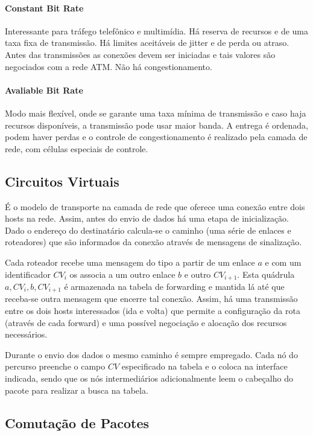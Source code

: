\paragraph{Constant Bit Rate} Interessante para tráfego telefônico e multimídia. Há reserva de recursos e de uma taxa fixa de transmissão. 
Há limites aceitáveis de jitter e de perda ou atraso.
Antes das transmissões as conexões devem ser iniciadas e tais valores são negociados com a rede ATM.
Não há congestionamento.

\paragraph{Avaliable Bit Rate} Modo mais flexível, onde se garante uma taxa mínima de transmissão 
e caso haja recursos disponíveis, a transmissão pode usar maior banda.
A entrega é ordenada, podem haver perdas e o controle de congestionamento é realizado pela camada de rede, com células especiais de controle.

\subsection{Circuitos Virtuais}

É o modelo de transporte na camada de rede que oferece uma conexão entre dois hosts na rede.
Assim, antes do envio de dados há uma etapa de inicialização.
Dado o endereço do destinatário calcula-se o caminho (uma série de enlaces e roteadores) que são informados da conexão através de mensagens de sinalização.

Cada roteador recebe uma mensagem do tipo a partir de um enlace $a$ e com um identificador $CV_i$ os associa a um outro enlace $b$ e outro $CV_{i+1}$.
Esta quádrula $a, CV_i, b, CV_{i+1}$ é armazenada na tabela de forwarding e mantida lá até que receba-se outra mensagem que encerre tal conexão.
Assim, há uma transmissão entre os dois hosts interessados (ida e volta) que permite a configuração da rota (através de cada forward)
e uma possível negociação e alocação dos recursos necessários.

Durante o envio dos dados o mesmo caminho é sempre empregado. 
Cada nó do percurso preenche o campo $CV$ especificado na tabela e o coloca na interface indicada, 
sendo que os nós intermediários adicionalmente leem o cabeçalho do pacote para realizar a busca na tabela.

\subsection{Comutação de Pacotes}

